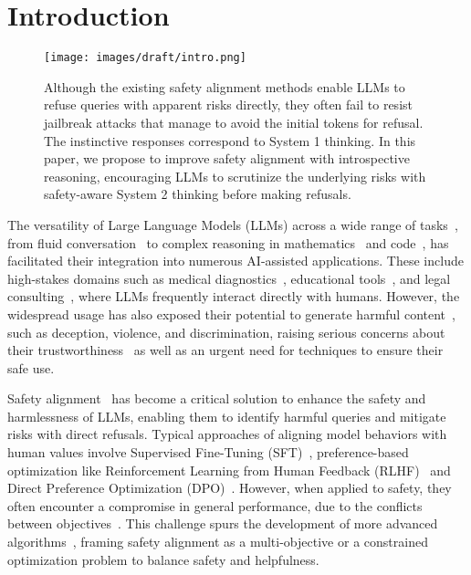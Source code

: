 \section{Introduction}
\begin{figure}
    \centering
    \texttt{[image: images/draft/intro.png]}
    \vspace{-4ex}
    \caption{Although the existing safety alignment methods enable LLMs to refuse queries with apparent risks directly, they often fail to resist jailbreak attacks that manage to avoid the initial tokens for refusal. The instinctive responses correspond to System 1 thinking. In this paper, we propose to improve safety alignment with introspective reasoning, encouraging LLMs to scrutinize the underlying risks with safety-aware System 2 thinking before making refusals.}
    \label{fig:intro}
\end{figure}

The versatility of Large Language Models (LLMs) across a wide range of tasks~\cite{achiam2023gpt, bai2023qwen, dubey2024llama}, from fluid conversation~\cite{dubois2024length} to complex reasoning in mathematics~\cite{cobbe2021training,hendrycks2measuring} and code~\cite{chen2021evaluating,nam2024using}, has facilitated their integration into numerous AI-assisted applications. These include high-stakes domains such as medical diagnostics~\cite{ullah2024challenges}, educational tools~\cite{zhang2024simulating}, and legal consulting~\cite{nigam2024rethinking}, where LLMs frequently interact directly with humans. However, the widespread usage has also exposed their potential to generate harmful content~\cite{dong2024attacks}, such as deception, violence, and discrimination, raising serious concerns about their trustworthiness~\cite{liu2023jailbreaking,wangdecodingtrust} as well as an urgent need for techniques to ensure their safe use. 


Safety alignment~\cite{bai2022training,daisafe} has become a critical solution to enhance the safety and harmlessness of LLMs, enabling them to identify harmful queries and mitigate risks with direct refusals. Typical approaches of aligning model behaviors with human values involve Supervised Fine-Tuning (SFT)~\cite{liu2023makes,alpaca}, preference-based optimization like Reinforcement Learning from Human Feedback (RLHF)~\cite{ouyang2022training,bai2022training} and Direct Preference Optimization (DPO)~\cite{rafailov2024direct,liu2024enhancing}. However, when applied to safety, they often encounter a compromise in general performance, due to the conflicts between objectives~\cite{anwar2024foundational,lin2024mitigating}. This challenge spurs the development of more advanced algorithms~\cite{daisafe,wachi2024stepwise,zhou2024beyond}, framing safety alignment as a multi-objective or a constrained optimization problem to balance safety and helpfulness. 


